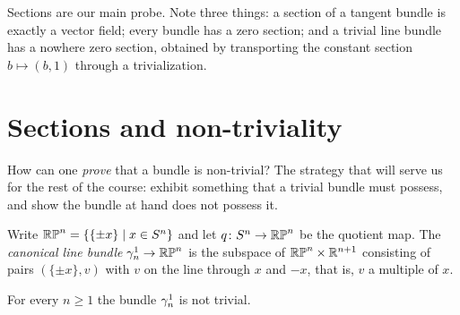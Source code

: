 Sections are our main probe. Note three things: a section of a tangent bundle is
exactly a vector field; every bundle has a zero section; and a trivial line
bundle has a nowhere zero section, obtained by transporting the constant section
$b\mapsto(b,1)$ through a trivialization.

\section{Sections and non-triviality}

\begin{guiding}
How can one \emph{prove} that a bundle is non-trivial? The strategy that will
serve us for the rest of the course: exhibit something that a trivial bundle
must possess, and show the bundle at hand does not possess it.
\end{guiding}

\begin{example}
Write $\mathbb{RP}^n=\{\{\pm x\}\mid x\in S^n\}$ and let $q\colon S^n\to\mathbb{RP}^n$ be the
quotient map. The \emph{canonical line bundle} $\gamma^1_n\to\mathbb{RP}^n$ is the subspace
of $\mathbb{RP}^n\times\mathbb{R}^{n+1}$ consisting of pairs $(\{\pm x\},v)$ with $v$ on the
line through $x$ and $-x$, that is, $v$ a multiple of $x$.
\end{example}

\begin{theorem}\label{thm:gamma-nontrivial}
For every $n\ge1$ the bundle $\gamma^1_n$ is not trivial.
\end{theorem}

